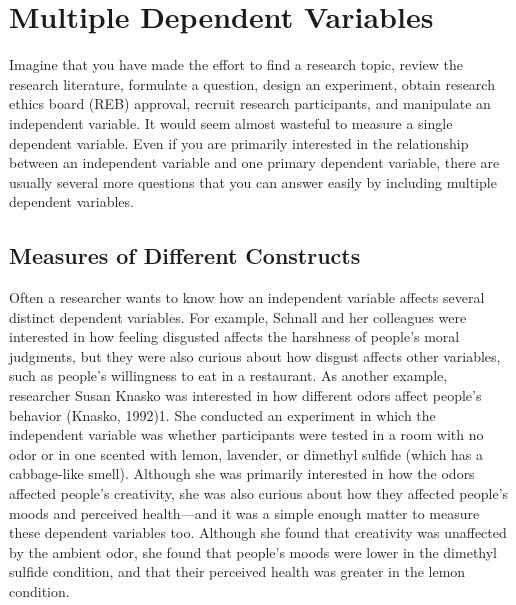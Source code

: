 \section{Multiple Dependent Variables}


Imagine that you have made the effort to find a research topic, review the research literature, formulate a question, design an experiment, obtain research ethics board (REB) approval, recruit research participants, and manipulate an independent variable. It would seem almost wasteful to measure a single dependent variable. Even if you are primarily interested in the relationship between an independent variable and one primary dependent variable, there are usually several more questions that you can answer easily by including multiple dependent variables.

\subsection{Measures of Different Constructs}

Often a researcher wants to know how an independent variable affects several distinct dependent variables. For example, Schnall and her colleagues were interested in how feeling disgusted affects the harshness of people's moral judgments, but they were also curious about how disgust affects other variables, such as people's willingness to eat in a restaurant. As another example, researcher Susan Knasko was interested in how different odors affect people's behavior (Knasko, 1992)1. She conducted an experiment in which the independent variable was whether participants were tested in a room with no odor or in one scented with lemon, lavender, or dimethyl sulfide (which has a cabbage-like smell). Although she was primarily interested in how the odors affected people's creativity, she was also curious about how they affected people's moods and perceived health---and it was a simple enough matter to measure these dependent variables too. Although she found that creativity was unaffected by the ambient odor, she found that people's moods were lower in the dimethyl sulfide condition, and that their perceived health was greater in the lemon condition.

